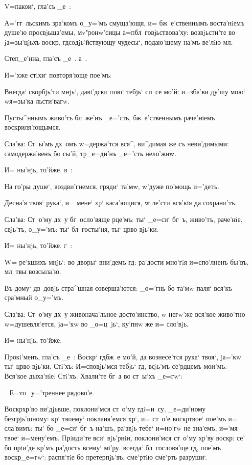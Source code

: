 V=пакои`, гла'съ _е~:

А='гг~льскимъ зра'комъ о_у='мъ смуща'ющя, и= 
бж~е'ственнымъ воста'нiемъ душе'ю просвjьща'емы, 
мv"ронw'сицы а=п бл~говjьствова'ху: возвjьсти'те во 
jа=зы'цjьхъ воскр, гд содjь'йствующу чудесы`, 
подаю'щему на'мъ ве'лiю мл.

Степ_е'нна, гла'съ _е~.  а~. 

И='хже стiхи` повторя'юще пое'мъ:

Внегда` скорбjь'ти мнjь`, давi'дски пою` тебjь` сп~се 
мо'й: и=зба'ви ду'шу мою` w\т я=зы'ка льсти'вагw.

Пусты^ннымъ живо'тъ бл~же'нъ _е='сть, бж~е'ственнымъ 
раче'нiемъ воскриля'ющымся. 

Сла'ва: Ст~ы'мъ дх~омъ w=держа'тся вся^, ви^димая же 
съ неви'димыми: самодержа'венъ бо сы'й, тр _е=ди'нъ 
_е='сть нело'жнw. 

И= ны'нjь, то'йже.  в~:

На го'ры душе`, воздви'гнемся, гряди` та'мw, 
w'дуже по'мощь и='детъ.

Десна'я твоя` рука`, и= мене` хр` каса'ющися, w\т 
ле'сти вся'кiя да сохрани'тъ.

Сла'ва: Ст~о'му дх~у бг~осло'вяще рце'мъ: ты` _е=си` 
бг~ъ, живо'тъ, раче'нiе, свjь'тъ, о_у='мъ: ты` 
бл~госты'ня, ты` цр во вjь'ки. 

И= ны'нjь, то'йже.  г~:

W= ре'кшихъ мнjь`: во дворы` вни'демъ гд: ра'дости 
мно'гiя и=спо'лненъ бы'въ, мл~твы возсыла'ю.

Въ дому` дв~довjь стра^шная соверша'ются: _о='гнь бо 
та'мw паля` вся'къ сра'мный о_у='мъ.

Сла'ва: Ст~о'му дх~у живонача'льное досто'инство, w\т 
негw'же вся'кое живо'тно w=душевля'ется, jа='кw во 
_о=ц~jь`, ку'пнw же и= сло'вjь.

И= ны'нjь, то'йже.

Прокi'менъ, гла'съ _е~: Воскр` гд бж~е мо'й, да 
вознесе'тся рука` твоя`, jа='кw ты` цр во вjь'ки. 
Стi'хъ: И=сповjь'мся тебjь` гд, всjь'мъ се'рдцемъ 
мои'мъ. Вся'кое дыха'нiе: Стi'хъ: Хвали'те бг~а во 
ст~ы'хъ _е=гw`:

_Е=v о_у='треннее рядово'е.

Воскр хр'во ви'дjьвше, поклони'мся ст~о'му 
гд i=и~су, _е=ди'ному безгрjь'шному: кр` твоему` 
покланя'емся хр`, и= ст~о'е воскр твое` пое'мъ 
и= сла'вимъ: ты' бо _е=си` бг~ъ на'шъ, ра'звjь тебе` 
и=но'гw не зна'емъ, и='мя твое` и=мену'емъ. Прiиди'те 
вси` вjь'рнiи, поклони'мся ст~о'му хр'ву воскр: 
се' бо прiи'де кр'мъ ра'дость всему` мi'ру. всегда` 
бл~гословя'ще гд, пое'мъ воскр _е=гw`: распя'тiе 
бо претерпjь'въ, сме'ртiю сме'рть разруши`. 

